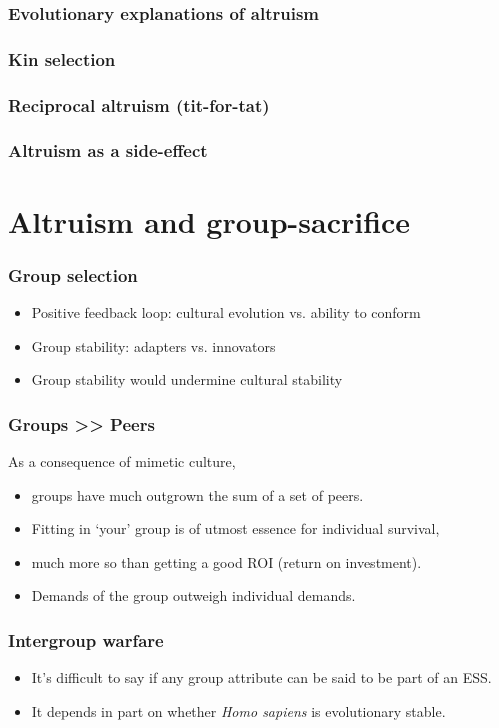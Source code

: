 \documentclass{beamer}
\begin{document}
\begin{frame}
  \frametitle{Evolutionary explanations of altruism}

  
\end{frame}

\begin{frame}
  \frametitle{Kin selection}
\end{frame}

\begin{frame}
  \frametitle{Reciprocal altruism (tit-for-tat)}
\end{frame}

\begin{frame}
  \frametitle{Altruism as a side-effect}
\end{frame}

\section{Altruism and group-sacrifice}

\begin{frame}
  \frametitle{Group selection}
  
  \begin{itemize}
    \item Positive feedback loop: cultural evolution vs. ability to conform
    \item Group stability: adapters vs. innovators
    \item Group stability would undermine cultural stability
  \end{itemize}
\end{frame}

\begin{frame}
  \frametitle{Groups >> Peers}
  
  As a consequence of mimetic culture,
  
  \begin{itemize}
    \item groups have much outgrown the sum of a set of peers.
    \item Fitting in `your' group is of utmost essence for individual survival,
    \item much more so than getting a good ROI (return on investment).
    \item Demands of the group outweigh individual demands.
  \end{itemize}
\end{frame}

\begin{frame}
  \frametitle{Intergroup warfare}
  
  \begin{itemize}
    \item It's difficult to say if any group attribute can be said to be part of an ESS.
    \item It depends in part on whether \textit{Homo sapiens} is evolutionary stable.
    
  \end{itemize}
\end{frame}
\end{document}
